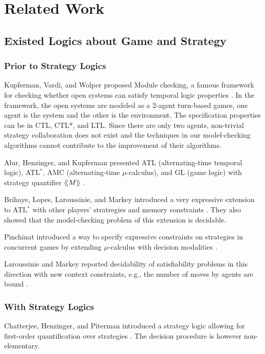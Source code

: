 \chapter{Related Work}

\section{Existed Logics about Game and Strategy}
\subsection{Prior to Strategy Logics}
Kupferman, Vardi, and Wolper proposed Module checking, a famous framework for checking whether open systems can satisfy temporal logic properties \cite{KVW01}.
In the framework, the open systems are modeled as a 2-agent turn-based games, one agent is the system and the other is the environment.
The specification properties can be in CTL, CTL*, and LTL.
Since there are only two agents, non-trivial strategy collaboration does not exist and the techniques in our model-checking algorithms cannot contribute to the improvement of their algorithms. 

Alur, Henzinger, and Kupferman presented ATL (alternating-time temporal logic), ATL$^*$, AMC (alternating-time $\mu$-calculus), and GL (game logic) with strategy quantifier $\langle\!\langle M\rangle\!\rangle$ \cite{AHK02}.  
 
Brihaye, Lopes, Laroussinie, and Markey introduced a very expressive extension to ATL$^*$ with other players' stratregies and memory constraints \cite{BLLM09}.  
They also showed that the model-checking problem of this extension is decidable. 

Pinchinat introduced a way to specify expressive constraints on strategies in concurrent games by extending $\mu$-calculus with decision modalities \cite{Pinchinat07}. 

Laroussinie and Markey reported decidability of satisfiability problems in this direction with new context constraints, e.g., the number of moves by agents are bound \cite{LM13}.

\subsection{With Strategy Logics}
Chatterjee, Henzinger, and Piterman introduced a strategy logic allowing for first-order quantification over strategies \cite{CHP10}.  
The decision procedure is however non-elementary.  

